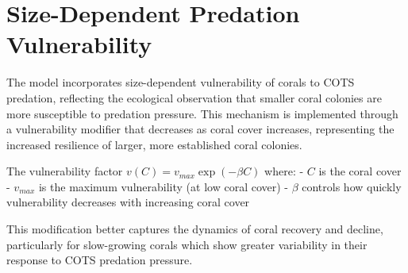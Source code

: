 \section{Size-Dependent Predation Vulnerability}

The model incorporates size-dependent vulnerability of corals to COTS predation, reflecting the ecological observation that smaller coral colonies are more susceptible to predation pressure. This mechanism is implemented through a vulnerability modifier that decreases as coral cover increases, representing the increased resilience of larger, more established coral colonies.

The vulnerability factor $v(C) = v_{max} \exp(-\beta C)$ where:
- $C$ is the coral cover
- $v_{max}$ is the maximum vulnerability (at low coral cover)
- $\beta$ controls how quickly vulnerability decreases with increasing coral cover

This modification better captures the dynamics of coral recovery and decline, particularly for slow-growing corals which show greater variability in their response to COTS predation pressure.
